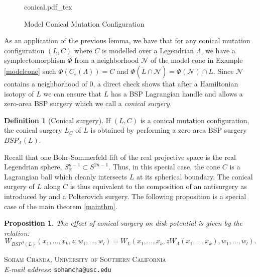 \documentclass[11pt, oneside,dvipsnames]{amsart}
\makeatletter
\newcommand{\incfig}[2]{
   
        \def\svgscale{#1}
    {#2.pdf_tex}
      
      
  
 }
\newcommand{\wt}{\widetilde}
\newcommand{\<}{\langle}
\renewcommand{\>}{\rangle}
\newcommand{\bR}{\mathbb{R}}
\newcommand{\cN}{\mathcal{N}}
\newtheorem{prop}[Theorem]{Proposition}
\theoremstyle{definition}
\newcommand{\Addresses}{{%
  \bigskip
  \footnotesize

  
  \textsc{Soham Chanda, University of Southern California}\\
 \indent\textit{E-mail address}: \texttt{sohamcha@usc.edu}\par
}}
\theoremstyle{definition}
\newtheorem{defn}[Theorem]{Definition}
\numberwithin{equation}{subsection}
\makeatother
\begin{document}
\begin{figure}
    \centering
    \incfig{1}{conical}
    \caption{Model Conical Mutation Configuration}
    \label{conicalfig}
\end{figure}

As an application of the previous lemma, we have that for any conical mutation configuration $(L,C)$ where $C$ is modelled over a Legendrian $\Lambda$, we have a symplectomorphism $\Phi$ from a neighborhood $\cN$ of the model cone in Example \ref{modelcone} such $\Phi(C_s(\Lambda)) = C$ and $\Phi(\wt L \cap \cN ) = \Phi(\cN) \cap L.$ Since $\cN$ contains a neighborhood of $0$, a direct check shows that after a Hamiltonian isotopy of $L$ we can ensure that $L$ has a BSP Lagrangian handle and allows a zero-area BSP surgery which we call a \textit{conical surgery.} 

\begin{defn}[Conical surgery]
      If $(L,C)$ is a conical mutation configuration,  the conical surgery $L_C$ of $L$ is obtained by performing a zero-area BSP surgery $BSP_\Lambda (L)$.
\end{defn}

\noindent Recall that one Bohr-Sommerfeld lift of the real projective space is the real Legendrian sphere, $S^{n-1}_\bR \subset S^{2n-1}.$ Thus, in this special case, the cone $C$ is a Lagrangian ball which cleanly intersects $L$ at its spherical boundary. The conical surgery of $L$ along $C$ is thus equivalent to the composition of an antisurgery as introduced by \cite{haug} and a Polterovich surgery. The following proposition is a special case of the main theorem \ref{mainthm}.

\begin{prop}
  The effect of conical surgery on disk potential is given by the relation:
  $$ W_{BSP^\Lambda(L)}(x_1,\dots,x_k,z,w_1,\dots,w_l)
 =W_L(x_1,\dots,x_k,zW_{\Lambda}(x_1,\dots,x_k),w_1,\dots,w_l). $$
\end{prop}

% 



\Addresses
\end{document}
